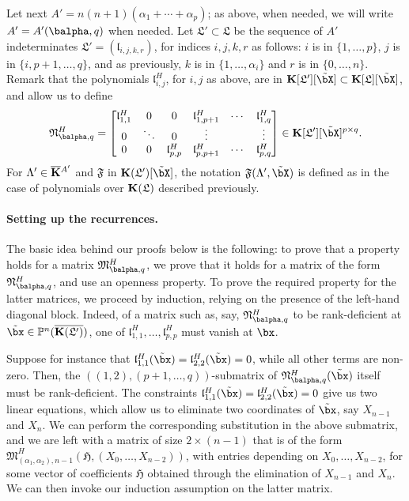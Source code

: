 \documentclass[12pt]{article}
\begin{document}
Let next $A'=n(n+1)(\alpha_1+\cdots+\alpha_p)$; as above, when needed,
we will write $A'=A'(\balpha,q)$ when needed. Let
$\mathfrak{L}'\subset \mathfrak{L}$ be the sequence of $A'$
indeterminates $\mathfrak{L}'=(\mathfrak{l}_{i,j,k,r})$, for indices
$i,j,k,r$ as follows: $i$ is in $\{1,\dots,p\}$, $j$ is in
$\{i,p+1,\dots,q\}$, and as previously, $k$ is in
$\{1,\dots,\alpha_i\}$ and $r$ is in $\{0,\dots,n\}$. Remark that the
polynomials $\mathfrak{l}^H_{i,j}$, for $i,j$ as above, are in
$\KK[\mathfrak{L}'][\tilde\bX] \subset \KK[\mathfrak{L}][\tilde \bX]$,
and allow us to define
\begin{align}\label{eq:matMprime}
\mathfrak{N}^H_{\balpha,q}=\left [\begin{matrix} \mathfrak{l}^H_{1,1} & 0 & 0
    &\mathfrak{l}^H_{1,p+1} & \cdots & \mathfrak{l}^H_{1,q}\\ 0 & \ddots &
    0 & \vdots & & \vdots\\ 0&0& \mathfrak{l}^H_{p,p}
    &\mathfrak{l}^H_{p,p+1} & \cdots & \mathfrak{l}^H_{p,q}
  \end{matrix}\right ]\in \KK[\mathfrak{L}'][\tilde\bX]^{p\times q}.
\end{align}
For $\Lambda' \in \overline{\mathbf{K}}{}^{A'}$ and $\mathfrak{F}$ in 
$\KK(\mathfrak{L}')[\tilde\bX]$, the notation
$\mathfrak{F}(\Lambda',\tilde\bX)$ is defined as in the case of
polynomials over $\mathbf{K}(\mathfrak{L})$ described previously.


\paragraph{Setting up the recurrences.}
The basic idea behind our proofs below is the following: to prove that
a property holds for a matrix $\mathfrak{M}^H_{\balpha,q}$, we prove
that it holds for a matrix of the form $\mathfrak{N}^H_{\balpha,q}$,
and use an openness property. To prove the required property for the
latter matrices, we proceed by induction, relying on the presence of
the left-hand diagonal block. Indeed, of a matrix such as, say,
$\mathfrak{N}^H_{\balpha,q}$ to be rank-deficient at $\tilde\bx \in
\P^n(\KKGpbar)$, one of
$\mathfrak{l}^H_{1,1},\dots,\mathfrak{l}^H_{p,p}$ must vanish at
$\bx$.

Suppose for instance that
$\mathfrak{l}^H_{1,1}(\tilde\bx)=\mathfrak{l}^H_{2,2}(\tilde\bx)=0$,
while all other terms are non-zero. Then, the
$((1,2),(p+1,\dots,q))$-submatrix of
${\mathfrak{N}^H_{\balpha,q}}(\tilde\bx)$ itself must be
rank-deficient.  The constraints
$\mathfrak{l}^H_{1,1}(\tilde\bx)=\mathfrak{l}^H_{2,2}(\tilde\bx)=0$
give us two linear equations, which allow us to eliminate two
coordinates of $\tilde\bx$, say $X_{n-1}$ and $X_n$. We can perform
the corresponding substitution in the above submatrix, and we are left
with a matrix of size $2 \times (n-1)$ that is of the form
$\mathfrak{M}^H_{(\alpha_1,\alpha_2),n-1}(\mathfrak{H},(X_0,\dots,X_{n-2}))$,
with entries depending on $X_0,\dots,X_{n-2}$, for some vector of
coefficients $\mathfrak{H}$ obtained through the elimination of
$X_{n-1}$ and $X_n$. We can then invoke our induction assumption on
the latter matrix.
\end{document}
